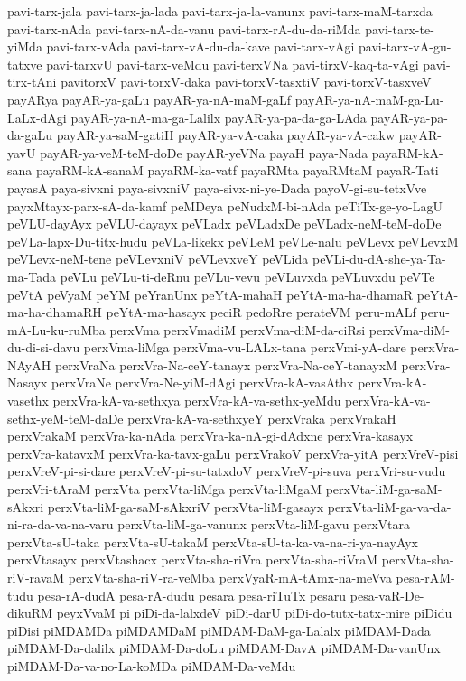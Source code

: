 {pavi-tarx-jala
pavi-tarx-ja-lada
pavi-tarx-ja-la-vanunx
pavi-tarx-maM-tarxda
pavi-tarx-nAda
pavi-tarx-nA-da-vanu
pavi-tarx-rA-du-da-riMda
pavi-tarx-te-yiMda
pavi-tarx-vAda
pavi-tarx-vA-du-da-kave
pavi-tarx-vAgi
pavi-tarx-vA-gu-tatxve
pavi-tarxvU
pavi-tarx-veMdu
pavi-terxVNa
pavi-tirxV-kaq-ta-vAgi
pavi-tirx-tAni
pavitorxV
pavi-torxV-daka
pavi-torxV-tasxtiV
pavi-torxV-tasxveV
payARya
payAR-ya-gaLu
payAR-ya-nA-maM-gaLf
payAR-ya-nA-maM-ga-Lu-LaLx-dAgi
payAR-ya-nA-ma-ga-Lalilx
payAR-ya-pa-da-ga-LAda
payAR-ya-pa-da-gaLu
payAR-ya-saM-gatiH
payAR-ya-vA-caka
payAR-ya-vA-cakw
payAR-yavU
payAR-ya-veM-teM-doDe
payAR-yeVNa
payaH
paya-Nada
payaRM-kA-sana
payaRM-kA-sanaM
payaRM-ka-vatf
payaRMta
payaRMtaM
payaR-Tati
payasA
paya-sivxni
paya-sivxniV
paya-sivx-ni-ye-Dada
payoV-gi-su-tetxVve
payxMtayx-parx-sA-da-kamf
peMDeya
peNudxM-bi-nAda
peTiTx-ge-yo-LagU
peVLU-dayAyx
peVLU-dayayx
peVLadx
peVLadxDe
peVLadx-neM-teM-doDe
peVLa-lapx-Du-titx-hudu
peVLa-likekx
peVLeM
peVLe-nalu
peVLevx
peVLevxM
peVLevx-neM-tene
peVLevxniV
peVLevxveY
peVLida
peVLi-du-dA-she-ya-Ta-ma-Tada
peVLu
peVLu-ti-deRnu
peVLu-vevu
peVLuvxda
peVLuvxdu
peVTe
peVtA
peVyaM
peYM
peYranUnx
peYtA-mahaH
peYtA-ma-ha-dhamaR
peYtA-ma-ha-dhamaRH
peYtA-ma-hasayx
peciR
pedoRre
perateVM
peru-mALf
peru-mA-Lu-ku-ruMba
perxVma
perxVmadiM
perxVma-diM-da-ciRsi
perxVma-diM-du-di-si-davu
perxVma-liMga
perxVma-vu-LALx-tana
perxVmi-yA-dare
perxVra-NAyAH
perxVraNa
perxVra-Na-ceY-tanayx
perxVra-Na-ceY-tanayxM
perxVra-Nasayx
perxVraNe
perxVra-Ne-yiM-dAgi
perxVra-kA-vasAthx
perxVra-kA-vasethx
perxVra-kA-va-sethxya
perxVra-kA-va-sethx-yeMdu
perxVra-kA-va-sethx-yeM-teM-daDe
perxVra-kA-va-sethxyeY
perxVraka
perxVrakaH
perxVrakaM
perxVra-ka-nAda
perxVra-ka-nA-gi-dAdxne
perxVra-kasayx
perxVra-katavxM
perxVra-ka-tavx-gaLu
perxVrakoV
perxVra-yitA
perxVreV-pisi
perxVreV-pi-si-dare
perxVreV-pi-su-tatxdoV
perxVreV-pi-suva
perxVri-su-vudu
perxVri-tAraM
perxVta
perxVta-liMga
perxVta-liMgaM
perxVta-liM-ga-saM-sAkxri
perxVta-liM-ga-saM-sAkxriV
perxVta-liM-gasayx
perxVta-liM-ga-va-da-ni-ra-da-va-na-varu
perxVta-liM-ga-vanunx
perxVta-liM-gavu
perxVtara
perxVta-sU-taka
perxVta-sU-takaM
perxVta-sU-ta-ka-va-na-ri-ya-nayAyx
perxVtasayx
perxVtashacx
perxVta-sha-riVra
perxVta-sha-riVraM
perxVta-sha-riV-ravaM
perxVta-sha-riV-ra-veMba
perxVyaR-mA-tAmx-na-meVva
pesa-rAM-tudu
pesa-rA-dudA
pesa-rA-dudu
pesara
pesa-riTuTx
pesaru
pesa-vaR-De-dikuRM
peyxVvaM
pi
piDi-da-lalxdeV
piDi-darU
piDi-do-tutx-tatx-mire
piDidu
piDisi
piMDAMDa
piMDAMDaM
piMDAM-DaM-ga-Lalalx
piMDAM-Dada
piMDAM-Da-dalilx
piMDAM-Da-doLu
piMDAM-DavA
piMDAM-Da-vanUnx
piMDAM-Da-va-no-La-koMDa
piMDAM-Da-veMdu
}
